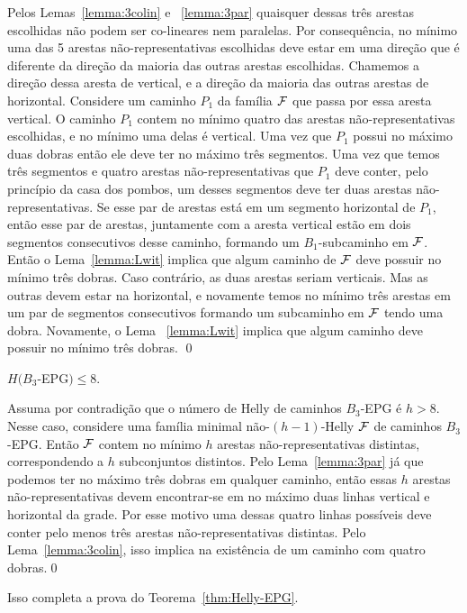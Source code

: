 Pelos Lemas~\ref{lemma:3colin} e ~\ref{lemma:3par} quaisquer dessas três arestas escolhidas não podem ser  co-lineares nem paralelas. Por consequência, no mínimo uma das 5 arestas não-representativas escolhidas deve estar em uma direção que é diferente da direção da maioria das outras arestas escolhidas. Chamemos a direção dessa aresta de vertical, e a direção da maioria das outras arestas de horizontal. Considere um caminho $P_1$ da família $\cal F$ que passa por essa aresta vertical. 
O caminho $P_1$ contem no mínimo quatro das arestas   não-representativas escolhidas, e no mínimo uma delas é vertical. Uma vez que $P_1$ possui no máximo duas dobras então ele deve ter no máximo três segmentos. Uma vez que temos três segmentos e quatro arestas não-representativas que $P_1$ deve conter, pelo princípio da casa dos pombos, um desses segmentos deve ter duas arestas não-representativas. Se esse par de arestas está em um segmento horizontal de $P_1$, então esse par de arestas, juntamente com a aresta vertical estão em dois segmentos consecutivos desse caminho, formando um $B_1$-subcaminho em $\cal F$. Então o Lema~\ref{lemma:Lwit} implica que algum caminho de $\cal F$ deve possuir no mínimo três dobras.  Caso contrário, as duas arestas seriam verticais. Mas as outras devem estar na  horizontal, e novamente temos no mínimo três arestas em um par de segmentos consecutivos formando um subcaminho em  $\cal F$ tendo uma dobra. Novamente, o  Lema ~\ref{lemma:Lwit} implica que algum caminho deve possuir no mínimo três dobras.
\qed

\begin{lema}\label{claim:upper-B3}
$H(B_3$-EPG$) \leq 8.$
\end{lema}

\proof
Assuma por contradição que o número de Helly de caminhos  $B_3$-EPG é $h > 8$. Nesse caso, considere uma família minimal não-$(h-1)$-Helly $\cal F$ de caminhos $B_3$-EPG. Então $\cal F$ contem no mínimo $h$  arestas não-representativas distintas,  correspondendo a  $h$ subconjuntos distintos. Pelo Lema~\ref{lemma:3par} já que podemos ter no máximo três dobras em qualquer caminho, então essas $h$ arestas  não-representativas devem encontrar-se em no máximo duas linhas vertical e horizontal da grade. Por esse motivo uma dessas quatro linhas possíveis deve conter pelo menos três arestas não-representativas distintas. Pelo  Lema~\ref{lemma:3colin},  isso implica na existência de um caminho com quatro dobras.\qed

Isso completa a prova do Teorema~\ref{thm:Helly-EPG}. 


